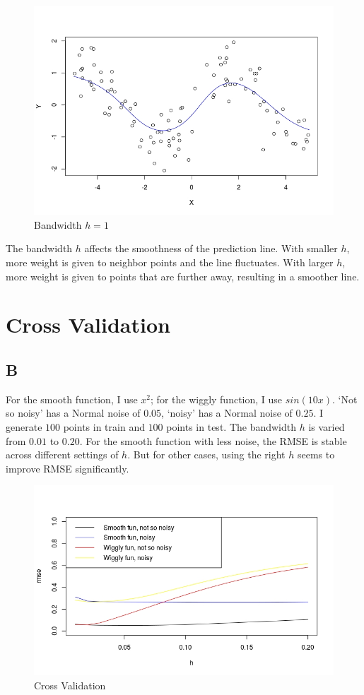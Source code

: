 \documentclass{article}
\begin{document}
\begin{figure}[h!]
\includegraphics[width = \textwidth]{h1.jpeg}
\caption{Bandwidth \(h = 1\)}
\end{figure}




The bandwidth \(h\) affects the smoothness of the prediction line. With smaller \(h\), more weight is given to neighbor points and the line fluctuates. With larger \(h\), more weight is given to points that are further away, resulting in a smoother line.

\section*{Cross Validation}
\subsection*{B}
For the smooth function, I use \(x^2\); for the wiggly function, I use \(sin(10x)\). `Not so noisy' has a Normal noise of \(0.05\), `noisy' has a Normal noise of \(0.25\). I generate \(100\) points in train and \(100\) points in test. The bandwidth \(h\) is varied from \(0.01\) to \(0.20\). For the smooth function with less noise, the RMSE is stable across different settings of \(h\). But for other cases, using the right \(h\) seems to improve RMSE significantly.
\begin{figure}[h!]
\includegraphics[width = \textwidth]{cv.jpeg}
\caption{Cross Validation}
\end{figure}
\end{document}
